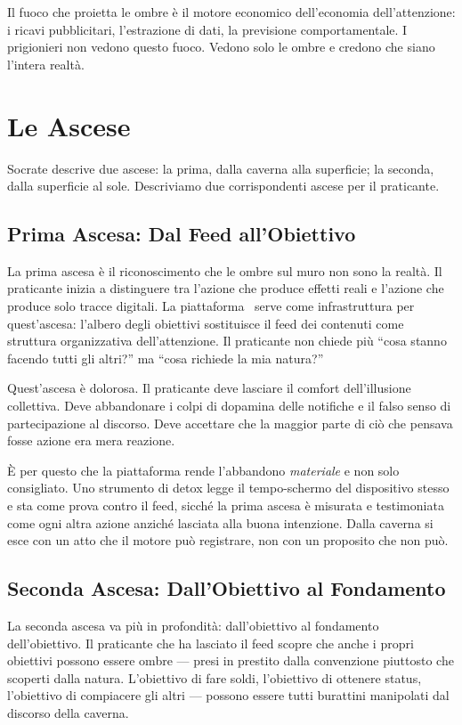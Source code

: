 Il fuoco che proietta le ombre \`e il motore economico dell'economia
dell'attenzione: i ricavi pubblicitari, l'estrazione di dati, la
previsione comportamentale. I prigionieri non vedono questo fuoco.
Vedono solo le ombre e credono che siano l'intera realt\`a.

\section{Le Ascese}

Socrate descrive due ascese: la prima, dalla caverna alla superficie;
la seconda, dalla superficie al sole. Descriviamo due corrispondenti
ascese per il praticante.

\subsection{Prima Ascesa: Dal Feed all'Obiettivo}

La prima ascesa \`e il riconoscimento che le ombre sul muro non sono
la realt\`a. Il praticante inizia a distinguere tra l'azione che
produce effetti reali e l'azione che produce solo tracce digitali. La
piattaforma \praxis\ serve come infrastruttura per quest'ascesa:
l'albero degli obiettivi sostituisce il feed dei contenuti come
struttura organizzativa dell'attenzione. Il praticante non chiede pi\`u
``cosa stanno facendo tutti gli altri?'' ma ``cosa richiede la mia
natura?''

Quest'ascesa \`e dolorosa. Il praticante deve lasciare il comfort
dell'illusione collettiva. Deve abbandonare i colpi di dopamina delle
notifiche e il falso senso di partecipazione al discorso. Deve accettare
che la maggior parte di ci\`o che pensava fosse azione era mera reazione.

\`E per questo che la piattaforma rende l'abbandono \emph{materiale} e non solo
consigliato. Uno strumento di detox legge il tempo-schermo del dispositivo stesso e
sta come prova contro il feed, sicch\'e la prima ascesa \`e misurata e testimoniata
come ogni altra azione anzich\'e lasciata alla buona intenzione. Dalla caverna si
esce con un atto che il motore pu\`o registrare, non con un proposito che non
pu\`o.

\subsection{Seconda Ascesa: Dall'Obiettivo al Fondamento}

La seconda ascesa va pi\`u in profondit\`a: dall'obiettivo al fondamento
dell'obiettivo. Il praticante che ha lasciato il feed scopre che anche
i propri obiettivi possono essere ombre --- presi in prestito dalla
convenzione piuttosto che scoperti dalla natura. L'obiettivo di fare
soldi, l'obiettivo di ottenere status, l'obiettivo di compiacere gli
altri --- possono essere tutti burattini manipolati dal discorso della
caverna.

